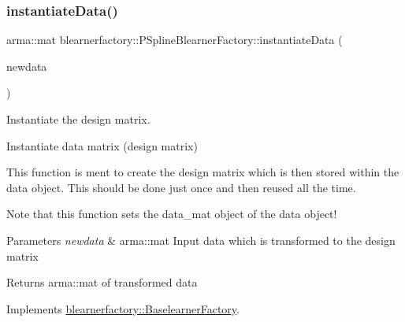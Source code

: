 \subsubsection{\texorpdfstring{instantiate\+Data()}{instantiateData()}}
{\footnotesize\ttfamily arma\+::mat blearnerfactory\+::\+P\+Spline\+Blearner\+Factory\+::instantiate\+Data (\begin{DoxyParamCaption}\item[{const arma\+::mat \&}]{newdata }\end{DoxyParamCaption})\hspace{0.3cm}{\ttfamily [virtual]}}



Instantiate the design matrix. 

Instantiate data matrix (design matrix)

This function is ment to create the design matrix which is then stored within the data object. This should be done just once and then reused all the time.

Note that this function sets the {\ttfamily data\+\_\+mat} object of the data object!


\begin{DoxyParams}{Parameters}
{\em newdata} & {\ttfamily arma\+::mat} Input data which is transformed to the design matrix\\
\hline
\end{DoxyParams}
\begin{DoxyReturn}{Returns}
{\ttfamily arma\+::mat} of transformed data 
\end{DoxyReturn}


Implements \hyperlink{classblearnerfactory_1_1_baselearner_factory_ac4a38c4815fb33b8d4785745117c5e57}{blearnerfactory\+::\+Baselearner\+Factory}.

